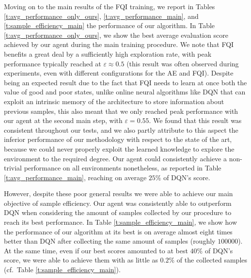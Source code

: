 Moving on to the main results of the FQI training, we report in Tables 
\ref{t:avg_performance_only_ours}, \ref{t:avg_performance_main}, and 
\ref{t:sample_efficiency_main} the performance of our algorithm.
In Table \ref{t:avg_performance_only_ours}, we show the best average evaluation 
score achieved by our agent during the main training procedure.
We note that FQI benefits a great deal by a sufficiently high exploration rate, 
with peak performance typically reached at $\varepsilon\approx0.5$ (this result was often
observed during experiments, even with different configurations for the AE and
FQI). 
Despite being an expected result due to the fact that FQI needs to learn at
once both the value of good and poor states, unlike online neural algorithms 
like DQN that can exploit an intrinsic memory of the architecture to store 
information about previous samples, this also meant that we only reached peak 
performance with our agent at the second main step, with $\varepsilon = 0.55$.
We found that this result was consistent throughout our tests, and we also 
partly attribute to this aspect the inferior performance of our methodology with
respect to the state of the art, because we could never properly exploit the 
learned knowledge to explore the environment to the required degree.
Our agent could consistently achieve a non-trivial performance on all
environments nonetheless, as reported in Table \ref{t:avg_performance_main}, 
reaching on average $25\%$ of DQN's score.

However, despite these poor general results we were able to achieve our main
objective of sample efficiency.
Our agent was consistently able to outperform DQN when considering the amount of
samples collected by our procedure to reach its best performance. 
In Table \ref{t:sample_efficiency_main}, we show how the performance of our 
algorithm at its best is on average almost eight times better than DQN after 
collecting the same amount of samples (roughly $100000$).
At the same time, even if our best scores amounted to at best $40\%$ of DQN's 
score, we were able to achieve them with as little as $0.2\%$ of the collected 
samples (cf.\ Table \ref{t:sample_efficiency_main}).

